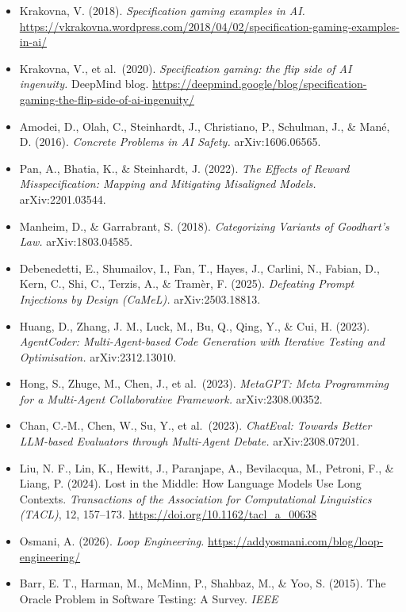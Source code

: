 \documentclass[
  11pt,
]{article}
\providecommand{\tightlist}{%
  \setlength{\itemsep}{0pt}\setlength{\parskip}{0pt}}
\begin{document}
\begin{itemize}
\tightlist
\item
  Krakovna, V. (2018). \emph{Specification gaming examples in AI.}
  \url{https://vkrakovna.wordpress.com/2018/04/02/specification-gaming-examples-in-ai/}
\item
  Krakovna, V., et al.~(2020). \emph{Specification gaming: the flip side
  of AI ingenuity.} DeepMind blog.
  \url{https://deepmind.google/blog/specification-gaming-the-flip-side-of-ai-ingenuity/}
\item
  Amodei, D., Olah, C., Steinhardt, J., Christiano, P., Schulman, J., \&
  Mané, D. (2016). \emph{Concrete Problems in AI Safety.}
  arXiv:1606.06565.
\item
  Pan, A., Bhatia, K., \& Steinhardt, J. (2022). \emph{The Effects of
  Reward Misspecification: Mapping and Mitigating Misaligned Models.}
  arXiv:2201.03544.
\item
  Manheim, D., \& Garrabrant, S. (2018). \emph{Categorizing Variants of
  Goodhart's Law.} arXiv:1803.04585.
\item
  Debenedetti, E., Shumailov, I., Fan, T., Hayes, J., Carlini, N.,
  Fabian, D., Kern, C., Shi, C., Terzis, A., \& Tramèr, F. (2025).
  \emph{Defeating Prompt Injections by Design (CaMeL).}
  arXiv:2503.18813.
\item
  Huang, D., Zhang, J. M., Luck, M., Bu, Q., Qing, Y., \& Cui, H.
  (2023). \emph{AgentCoder: Multi-Agent-based Code Generation with
  Iterative Testing and Optimisation.} arXiv:2312.13010.
\item
  Hong, S., Zhuge, M., Chen, J., et al.~(2023). \emph{MetaGPT: Meta
  Programming for a Multi-Agent Collaborative Framework.}
  arXiv:2308.00352.
\item
  Chan, C.-M., Chen, W., Su, Y., et al.~(2023). \emph{ChatEval: Towards
  Better LLM-based Evaluators through Multi-Agent Debate.}
  arXiv:2308.07201.
\item
  Liu, N. F., Lin, K., Hewitt, J., Paranjape, A., Bevilacqua, M.,
  Petroni, F., \& Liang, P. (2024). Lost in the Middle: How Language
  Models Use Long Contexts. \emph{Transactions of the Association for
  Computational Linguistics (TACL)}, 12, 157--173.
  \url{https://doi.org/10.1162/tacl_a_00638}
\item
  Osmani, A. (2026). \emph{Loop Engineering.}
  \url{https://addyosmani.com/blog/loop-engineering/}
\item
  Barr, E. T., Harman, M., McMinn, P., Shahbaz, M., \& Yoo, S. (2015).
  The Oracle Problem in Software Testing: A Survey. \emph{IEEE
}
\end{itemize}
\end{document}
